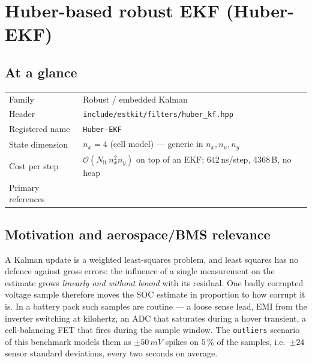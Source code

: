 \providecommand{\vf}{\bm{f}} \providecommand{\vh}{\bm{h}}
\providecommand{\vd}{\bm{d}} \providecommand{\mM}{\bm{M}}
\providecommand{\va}{\bm{a}} \providecommand{\vb}{\bm{b}}

\chapter{Huber-based robust EKF (Huber-EKF)}
\label{ch:huberekf}

\section*{At a glance}
\begin{tabular}{@{}l>{\raggedright\arraybackslash}p{}@{}}
Family & Robust / embedded Kalman \\
Header & \texttt{include/estkit/filters/huber\_kf.hpp} \\
Registered name & \texttt{Huber-EKF} \\
State dimension & $n_x = 4$ (cell model) --- generic in $n_x, n_u, n_y$ \\
Cost per step & $\mathcal{O}(N_{\mathrm{it}}\,n_x^2 n_y)$ on top of an EKF;
  642\,ns/step, 4368\,B, no heap \\
Primary references & \cite{huber1964,karlgaard2007huber,huber2009robust,bucyjoseph1968} \\
\end{tabular}

\section{Motivation and aerospace/BMS relevance}
A Kalman update is a weighted least-squares problem, and least squares has no defence against
gross errors: the influence of a single measurement on the estimate grows \emph{linearly and
without bound} with its residual.  One badly corrupted voltage sample therefore moves the SOC
estimate in proportion to how corrupt it is.  In a battery pack such samples are routine ---
a loose sense lead, EMI from the inverter switching at kilohertz, an ADC that saturates during a
hover transient, a cell-balancing FET that fires during the sample window.  The
\texttt{outliers} scenario of this benchmark models them as $\pm50\,mV$ spikes on
$5\,\%$ of the samples, i.e.\ $\pm24$ sensor standard deviations, every two seconds on average.

